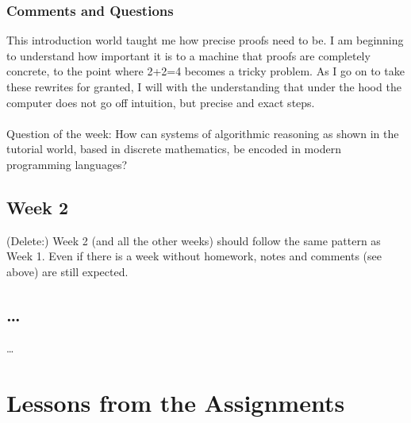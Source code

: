 \documentclass{article}
\theoremstyle{theorem}
\theoremstyle{definition}
\theoremstyle{remark}
\begin{document}
{%
%
%

\subsubsection*{Comments and Questions}

This introduction world taught me how precise proofs need to be. I am beginning to understand how important it is to a machine that proofs are completely concrete, to the point where 2+2=4 becomes a tricky problem. As I go on to take these rewrites for granted, I will with the understanding that under the hood the computer does not go off intuition, but precise and exact steps. \\\\
 Question of the week:
How can systems of algorithmic reasoning as shown in the tutorial world, based in discrete mathematics, be encoded in modern programming languages?

\subsection{Week 2}

(Delete:) Week 2 (and all the other weeks) should follow the same pattern as Week 1. Even if there is a week without homework, notes and comments (see above) are still expected.

\subsection{\ldots}

\ldots

\section{Lessons from the Assignments}

}
\end{document}
